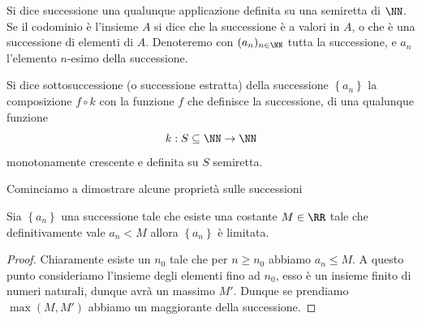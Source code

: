 \documentclass[11pt]{scrartcl}
\begin{document}
	\begin{definition}[Successione]
		Si dice successione una qualunque applicazione definita su una semiretta di $\NN$. Se il codominio è l'insieme $A$ si dice che la successione è a valori in $A$, o che è una successione di elementi di $A$. Denoteremo con $(a_n)_{n\in\NN}$ tutta la successione, e $a_n$ l'elemento $n$-esimo della successione.
	\end{definition}
	\begin{definition}
		Si dice sottosuccessione (o successione estratta) della successione $\left\{a_n\right\}$ la composizione $f\circ k$ con la funzione $f$ che definisce la successione, di una qualunque funzione 
		$$k:S\subseteq\NN\to\NN$$
		monotonamente crescente e definita su $S$ semiretta.
	\end{definition}
	Cominciamo a dimostrare alcune proprietà sulle successioni
	\begin{proposition}\label{Definitivamente limitata implica limitata}
		Sia $\left\{a_n\right\}$ una successione tale che esiste una costante $M\in\RR$ tale che definitivamente vale $a_n<M$ allora $\left\{a_n\right\}$ è limitata.
	\end{proposition}
	
	\begin{proof}
		Chiaramente esiste un $n_0$ tale che per $n\ge n_0$ abbiamo $a_n\le M$. A questo punto consideriamo l'insieme degli elementi fino ad $n_0$, esso è un insieme finito di numeri naturali, dunque avrà un massimo $M'$. Dunque se prendiamo $\max\left(M,M'\right)$ abbiamo un maggiorante della successione.
	\end{proof}
\end{document}
